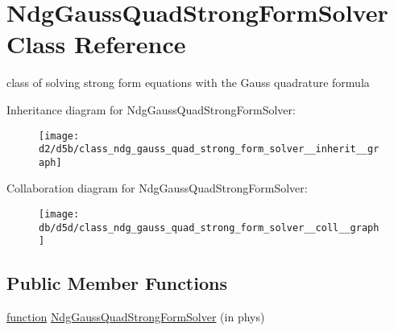 \hypertarget{class_ndg_gauss_quad_strong_form_solver}{}\section{Ndg\+Gauss\+Quad\+Strong\+Form\+Solver Class Reference}
\label{class_ndg_gauss_quad_strong_form_solver}


class of solving strong form equations with the Gauss quadrature formula  




Inheritance diagram for Ndg\+Gauss\+Quad\+Strong\+Form\+Solver\+:
\nopagebreak
\begin{figure}[H]
\begin{center}
\leavevmode
\texttt{[image: d2/d5b/class\_ndg\_gauss\_quad\_strong\_form\_solver\_\_inherit\_\_graph]}
\end{center}
\end{figure}


Collaboration diagram for Ndg\+Gauss\+Quad\+Strong\+Form\+Solver\+:
\nopagebreak
\begin{figure}[H]
\begin{center}
\leavevmode
\texttt{[image: db/d5d/class\_ndg\_gauss\_quad\_strong\_form\_solver\_\_coll\_\_graph]}
\end{center}
\end{figure}
\subsection*{Public Member Functions}
\begin{DoxyCompactItemize}
\item 
\hyperlink{class_ndg_gauss_quad_strong_form_solver_af755d69cea40fa91c0aab6b13409e11f}{function} \hyperlink{class_ndg_gauss_quad_strong_form_solver_a2bb0b9fcf04a7cb93c58b04c1aff93bb}{Ndg\+Gauss\+Quad\+Strong\+Form\+Solver} (in phys)
\end{DoxyCompactItemize}

